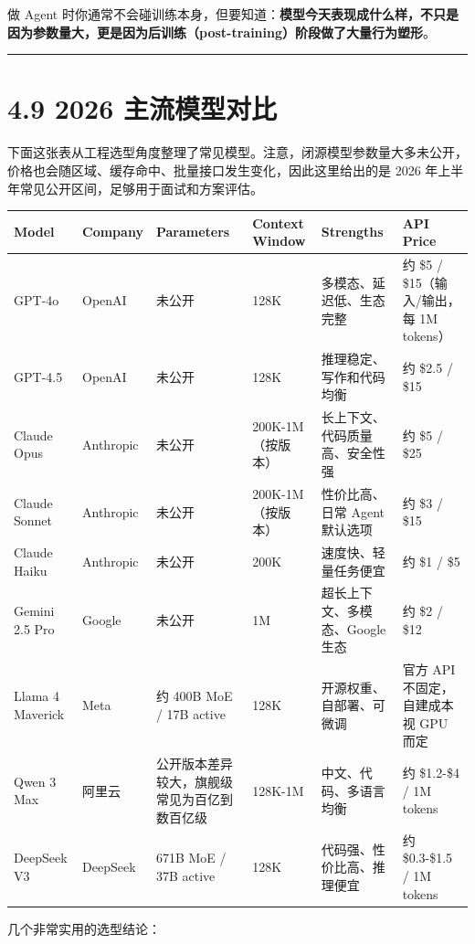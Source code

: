 做 Agent 时你通常不会碰训练本身，但要知道：\textbf{模型今天表现成什么样，不只是因为参数量大，更是因为后训练（post-training）阶段做了大量行为塑形}。


\bigskip\hrule\bigskip

\section{4.9 2026 主流模型对比}

下面这张表从工程选型角度整理了常见模型。注意，闭源模型参数量大多未公开，价格也会随区域、缓存命中、批量接口发生变化，因此这里给出的是 2026 年上半年常见公开区间，足够用于面试和方案评估。


\begingroup
\scriptsize
\setlength{\tabcolsep}{3pt}
\begin{longtable}{|p{}|p{}|p{}|p{}|p{}|p{}|}
\hline
Model & Company & Parameters & Context Window & Strengths & API Price \\ \hline
GPT-4o & OpenAI & 未公开 & 128K & 多模态、延迟低、生态完整 & 约 \$5 / \$15（输入/输出，每 1M tokens） \\ \hline
GPT-4.5 & OpenAI & 未公开 & 128K & 推理稳定、写作和代码均衡 & 约 \$2.5 / \$15 \\ \hline
Claude Opus & Anthropic & 未公开 & 200K-1M（按版本） & 长上下文、代码质量高、安全性强 & 约 \$5 / \$25 \\ \hline
Claude Sonnet & Anthropic & 未公开 & 200K-1M（按版本） & 性价比高、日常 Agent 默认选项 & 约 \$3 / \$15 \\ \hline
Claude Haiku & Anthropic & 未公开 & 200K & 速度快、轻量任务便宜 & 约 \$1 / \$5 \\ \hline
Gemini 2.5 Pro & Google & 未公开 & 1M & 超长上下文、多模态、Google 生态 & 约 \$2 / \$12 \\ \hline
Llama 4 Maverick & Meta & 约 400B MoE / 17B active & 128K & 开源权重、自部署、可微调 & 官方 API 不固定，自建成本视 GPU 而定 \\ \hline
Qwen 3 Max & 阿里云 & 公开版本差异较大，旗舰级常见为百亿到数百亿级 & 128K-1M & 中文、代码、多语言均衡 & 约 \$1.2-\$4 / 1M tokens \\ \hline
DeepSeek V3 & DeepSeek & 671B MoE / 37B active & 128K & 代码强、性价比高、推理便宜 & 约 \$0.3-\$1.5 / 1M tokens \\ \hline
\end{longtable}
\endgroup

几个非常实用的选型结论：


